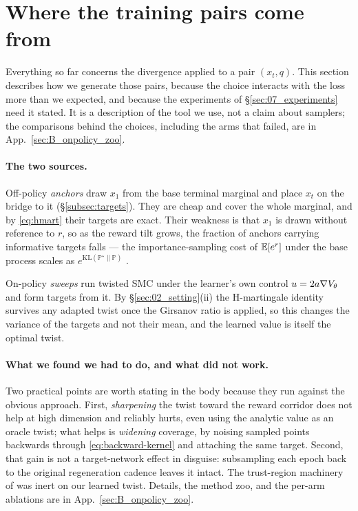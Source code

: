 \section{Where the training pairs come from}
\label{sec:06_sparsity_onpolicy}

Everything so far concerns the divergence applied to a pair $(x_t,q)$. This
section describes how we generate those pairs, because the choice interacts
with the loss more than we expected, and because the experiments of
\S\ref{sec:07_experiments} need it stated. It is a description of the tool we
use, not a claim about samplers; the comparisons behind the choices, including
the arms that failed, are in App.~\ref{sec:B_onpolicy_zoo}.

\paragraph{The two sources.}
Off-policy \emph{anchors} draw $x_1$ from the base terminal marginal and place
$x_t$ on the bridge to it (\S\ref{subsec:targets}). They are cheap and cover
the whole marginal, and by \eqref{eq:hmart} their targets are exact. Their
weakness is that $x_1$ is drawn without reference to $r$, so as the reward tilt
grows, the fraction of anchors carrying informative targets falls --- the
importance-sampling cost of $\mathbb{E}[e^{r}]$ under the base process scales as
$e^{\mathrm{KL}(\mathbb{P}^{\star}\|\mathbb{P})}$ \citep{chatterjee2018sample}.

On-policy \emph{sweeps} run twisted SMC under the learner's own control
$u=2a\nabla V_\theta$ and form targets from it. By
\S\ref{sec:02_setting}(ii) the H-martingale identity survives any adapted
twist once the Girsanov ratio is applied, so this changes the variance of the
targets and not their mean, and the learned value is itself the optimal twist.

\paragraph{What we found we had to do, and what did not work.}
Two practical points are worth stating in the body because they run against the
obvious approach. First, \emph{sharpening} the twist toward the reward corridor
does not help at high dimension and reliably hurts, even using the analytic
value as an oracle twist; what helps is \emph{widening} coverage, by noising
sampled points backwards through \eqref{eq:backward-kernel} and attaching the
same target. Second, that gain is not a target-network effect in disguise:
subsampling each epoch back to the original regeneration cadence leaves it
intact. The trust-region machinery of \citet{wang2026tritsmc} was inert on our
learned twist. Details, the method zoo, and the per-arm ablations are in
App.~\ref{sec:B_onpolicy_zoo}.

